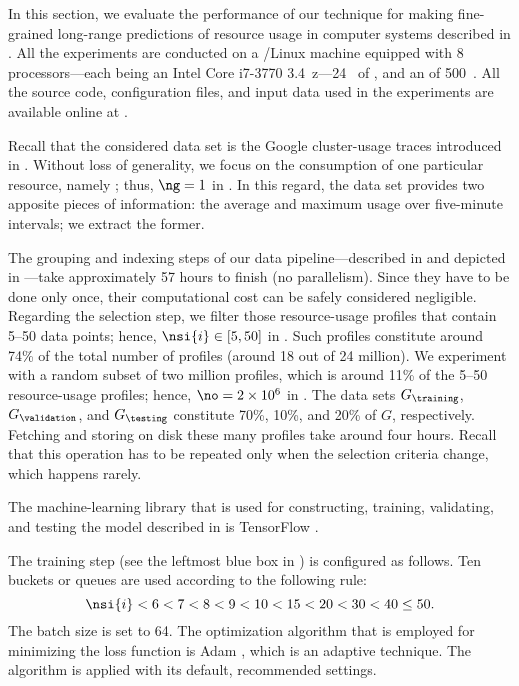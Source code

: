 In this section, we evaluate the performance of our technique for making
fine-grained long-range predictions of resource usage in computer systems
described in . All the experiments are conducted on a
/Linux machine equipped with 8 processors---each being an Intel Core
i7-3770 3.4~z---24~ of , and an  of 500~.
All the source code, configuration files, and input data used in the experiments
are available online at \cite{eslab2017b}.


Recall that the considered data set is the Google cluster-usage traces
\cite{reiss2011} introduced in . Without loss of
generality, we focus on the consumption of one particular resource, namely
; thus, $\ng = 1$ in . In this regard, the data set
provides two apposite pieces of information: the average and maximum 
usage over five-minute intervals; we extract the former.

The grouping and indexing steps of our data pipeline---described in
 and depicted in ---take
approximately 57 hours to finish (no parallelism). Since they have to be done
only once, their computational cost can be safely considered negligible.
Regarding the selection step, we filter those resource-usage profiles that
contain 5--50 data points; hence, $\nsi{i} \in [5, 50]$ in .
Such profiles constitute around 74\% of the total number of profiles (around 18
out of 24 million). We experiment with a random subset of two million profiles,
which is around 11\% of the 5--50 resource-usage profiles; hence, $\no = 2
\times 10^6$ in . The data sets $G_\training$,
$G_\validation$, and $G_\testing$ constitute 70\%, 10\%, and 20\% of $G$,
respectively. Fetching and storing on disk these many profiles take around four
hours. Recall that this operation has to be repeated only when the selection
criteria change, which happens rarely.


The machine-learning library that is used for constructing, training,
validating, and testing the model described in  is
TensorFlow \cite{abadi2015}.

The training step (see the leftmost blue box in ) is
configured as follows. Ten buckets or queues are used according to the following
rule:
\[
  \nsi{i} < 6 < 7 < 8 < 9 < 10 < 15 < 20 < 30 < 40 \leq 50.
\]
The batch size \nb is set to 64. The optimization algorithm that is employed for
minimizing the loss function is Adam \cite{kingma2014}, which is an adaptive
technique. The algorithm is applied with its default, recommended settings.

